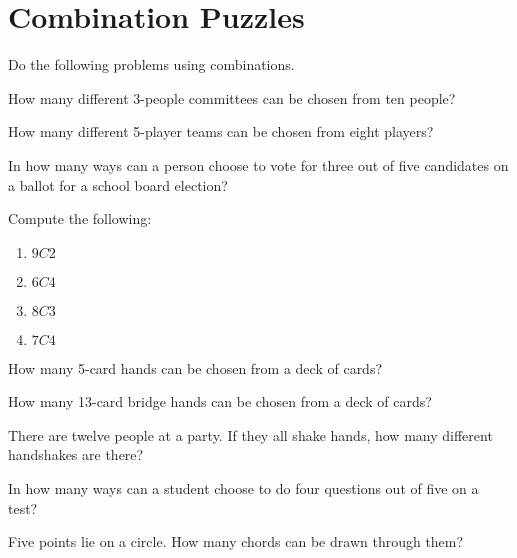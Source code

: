 \section{Combination Puzzles}

Do the following problems using combinations.

\begin{puzzle}
    How many different 3-people committees can be chosen from ten people?
\end{puzzle}

\begin{puzzle}
    How many different 5-player teams can be chosen from eight players?
\end{puzzle}

\begin{puzzle}
    In how many ways can a person choose to vote for three out of five candidates on a ballot for a school board election?
\end{puzzle}

\begin{puzzle}
    Compute the following:
    \begin{enumerate}
        \item \( 9C2 \)
        \item \( 6C4 \)
        \item \( 8C3 \)
        \item \( 7C4 \)
    \end{enumerate}
\end{puzzle}

\begin{puzzle}
    How many 5-card hands can be chosen from a deck of cards?
\end{puzzle}

\begin{puzzle}
    How many 13-card bridge hands can be chosen from a deck of cards?
\end{puzzle}

\begin{puzzle}
    There are twelve people at a party. If they all shake hands, how many different handshakes are there?
\end{puzzle}

\begin{puzzle}
    In how many ways can a student choose to do four questions out of five on a test?
\end{puzzle}

\begin{puzzle}
    Five points lie on a circle. How many chords can be drawn through them?
\end{puzzle}

